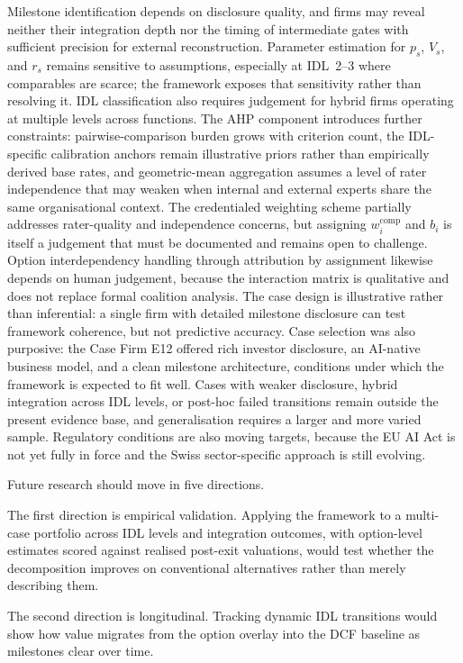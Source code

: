 \documentclass[oneside,10pt]{swissi}
\begin{document}
Milestone identification depends on disclosure quality, and firms may reveal neither their integration depth nor the timing of intermediate gates with sufficient precision for external reconstruction. Parameter estimation for $p_s$, $V_s$, and $r_s$ remains sensitive to assumptions, especially at IDL~2--3 where comparables are scarce; the framework exposes that sensitivity rather than resolving it. IDL classification also requires judgement for hybrid firms operating at multiple levels across functions. The AHP component introduces further constraints: pairwise-comparison burden grows with criterion count, the IDL-specific calibration anchors remain illustrative priors rather than empirically derived base rates, and geometric-mean aggregation assumes a level of rater independence that may weaken when internal and external experts share the same organisational context. The credentialed weighting scheme partially addresses rater-quality and independence concerns, but assigning $w_i^{\mathrm{comp}}$ and $b_i$ is itself a judgement that must be documented and remains open to challenge. Option interdependency handling through attribution by assignment likewise depends on human judgement, because the interaction matrix is qualitative and does not replace formal coalition analysis. The case design is illustrative rather than inferential: a single firm with detailed milestone disclosure can test framework coherence, but not predictive accuracy. Case selection was also purposive: the Case Firm E12 offered rich investor disclosure, an AI-native business model, and a clean milestone architecture, conditions under which the framework is expected to fit well. Cases with weaker disclosure, hybrid integration across IDL levels, or post-hoc failed transitions remain outside the present evidence base, and generalisation requires a larger and more varied sample. Regulatory conditions are also moving targets, because the EU AI Act is not yet fully in force and the Swiss sector-specific approach is still evolving.

Future research should move in five directions.

The first direction is empirical validation. Applying the framework to a multi-case portfolio across IDL levels and integration outcomes, with option-level estimates scored against realised post-exit valuations, would test whether the decomposition improves on conventional alternatives rather than merely describing them.

The second direction is longitudinal. Tracking dynamic IDL transitions would show how value migrates from the option overlay into the DCF baseline as milestones clear over time.
\end{document}
